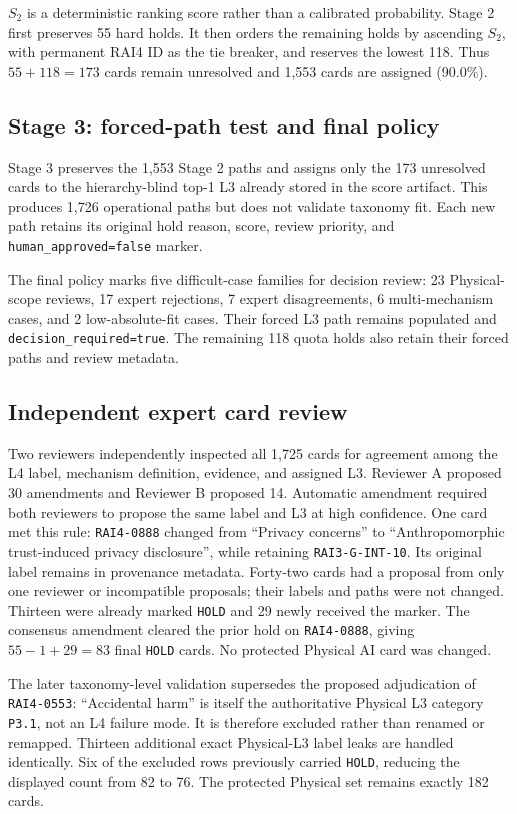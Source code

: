 \documentclass[11pt,a4paper]{article}
\newcommand{\code}[1]{\texttt{#1}}
\begin{document}
$S_2$ is a deterministic ranking score rather than a calibrated probability.
Stage 2 first preserves 55 hard holds. It then orders the remaining holds by
ascending $S_2$, with permanent RAI4 ID as the tie breaker, and reserves the
lowest 118. Thus $55+118=173$ cards remain unresolved and 1,553 cards are
assigned (90.0\%).

\subsection{Stage 3: forced-path test and final policy}

Stage 3 preserves the 1,553 Stage 2 paths and assigns only the 173 unresolved
cards to the hierarchy-blind top-1 L3 already stored in the score artifact.
This produces 1,726 operational paths but does not validate taxonomy fit. Each
new path retains its original hold reason, score, review priority, and
\code{human\_approved=false} marker.

The final policy marks five difficult-case families for decision review:
23 Physical-scope reviews, 17 expert rejections, 7 expert disagreements,
6 multi-mechanism cases, and 2 low-absolute-fit cases. Their forced L3 path
remains populated and \code{decision\_required=true}. The
remaining 118 quota holds also retain their forced paths and review metadata.

\subsection{Independent expert card review}

Two reviewers independently inspected all 1,725 cards for agreement among the
L4 label, mechanism definition, evidence, and assigned L3. Reviewer A proposed
30 amendments and Reviewer B proposed 14. Automatic amendment required both
reviewers to propose the same label and L3 at high confidence. One card met this
rule: \code{RAI4-0888} changed from ``Privacy concerns'' to
``Anthropomorphic trust-induced privacy disclosure'', while retaining
\code{RAI3-G-INT-10}. Its original label remains in provenance metadata.
Forty-two cards had a proposal from only one reviewer or incompatible proposals;
their labels and paths were not changed. Thirteen were already marked \code{HOLD}
and 29 newly received the marker. The consensus amendment cleared the prior hold
on \code{RAI4-0888}, giving $55-1+29=83$ final \code{HOLD} cards. No protected
Physical AI card was changed.

The later taxonomy-level validation supersedes the proposed adjudication of
\code{RAI4-0553}: ``Accidental harm'' is itself the authoritative Physical L3
category \code{P3.1}, not an L4 failure mode. It is therefore excluded rather
than renamed or remapped. Thirteen additional exact Physical-L3 label leaks are
handled identically. Six of the excluded rows previously carried \code{HOLD},
reducing the displayed count from 82 to 76. The protected Physical set remains
exactly 182 cards.
\end{document}
